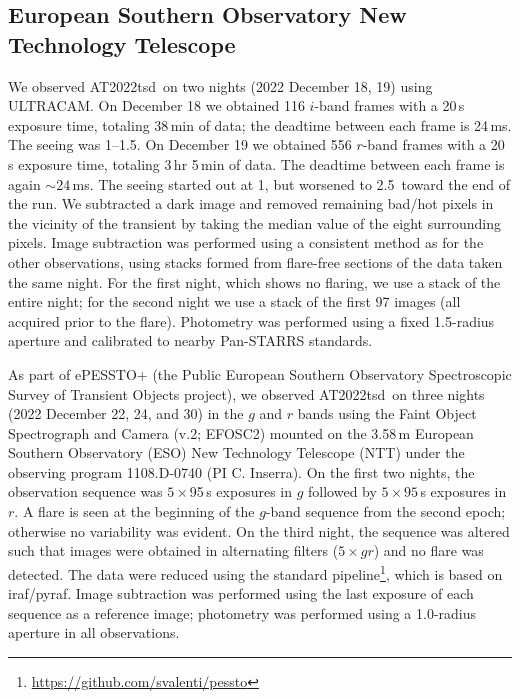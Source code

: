 \documentclass{nature_plusfigure}
\newcommand{\at}{AT2022tsd}
\begin{document}
\begin{methods}
\subsection{European Southern Observatory New Technology Telescope}
\label{sec:ntt}

We observed \at\ on two nights (2022 December 18, 19) using ULTRACAM\cite{Dhillon2007}. On December 18 we obtained 116 $i$-band frames with a 20\,s exposure time, totaling 38\,min of data; the deadtime between each frame is 24\,ms. The seeing was 1--1.5\arcsec. On December 19 we obtained 556 $r$-band frames with a 20\,s exposure time, totaling 3\,hr 5\,min of data. The deadtime between each frame is again $\sim 24$\,ms. The seeing started out at 1\arcsec, but worsened to 2.5\arcsec\ toward the end of the run. We subtracted a %
dark image and removed remaining bad/hot pixels in the vicinity of the transient by taking the median value of the eight surrounding pixels.  Image subtraction was performed %
using a consistent method as for the other observations, using stacks formed from flare-free sections of the data taken the same night.  For the first night, which shows no flaring, we use a stack of the entire night; for the second night we use a stack of the first 97 images (all acquired prior to the flare).  %
Photometry was performed using a fixed 1.5\arcsec-radius aperture and calibrated to nearby Pan-STARRS standards.

As part of ePESSTO+ (the Public European Southern Observatory Spectroscopic Survey of Transient Objects project\cite{Smartt2015}), we observed \at\ on three nights (2022 December 22, 24, and 30) in the $g$ and $r$ bands using the Faint Object Spectrograph and Camera (v.2; EFOSC2\cite{Buzzoni1984}) mounted on the 3.58\,m European Southern Observatory (ESO) New Technology Telescope (NTT) under the observing program 1108.D-0740 (PI C. Inserra). On the first two nights, the observation sequence was $5\times$95\,s exposures in $g$ followed by $5\times95$\,s exposures in $r$.  A flare is seen at the beginning of the $g$-band sequence from the second epoch; otherwise no variability was evident. On the third night, the sequence was altered such that images were obtained in alternating filters ($5\times gr$) and no flare was detected. The data were reduced using the standard pipeline\footnote{\url{ https://github.com/svalenti/pessto}}, which is based on iraf/pyraf. Image subtraction was performed using the last exposure of each sequence as a reference image; photometry was performed using a 1.0\arcsec-radius aperture in all observations.


\end{methods}
\end{document}
